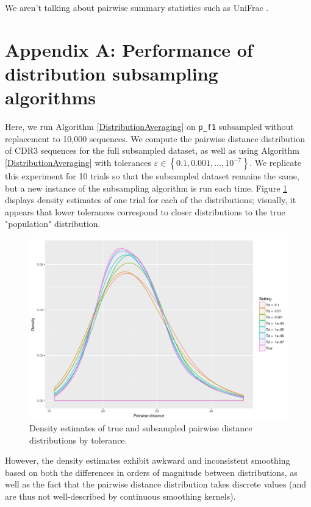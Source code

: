 \documentclass{article}
\begin{document}
We aren't talking about pairwise summary statistics such as UniFrac \cite{De_Bourcy2017-pu}.




\section*{Appendix A: Performance of distribution subsampling algorithms}
Here, we run Algorithm \ref{DistributionAveraging} on \texttt{p\_f1} subsampled without replacement to 10,000 sequences.
We compute the pairwise distance distribution of CDR3 sequences for the full subsampled dataset, as well as using Algorithm \ref{DistributionAveraging} with tolerances $\varepsilon \in \left\{0.1, 0.001, \dotsc, 10^{-7} \right\}$.
We replicate this experiment for 10 trials so that the subsampled dataset remains the same, but a new instance of the subsampling algorithm is run each time.
Figure \ref{fig:Distributions} displays density estimates of one trial for each of the distributions; visually, it appears that lower tolerances correspond to closer distributions to the true "population" distribution.
\begin{figure}
    \includegraphics[width=\linewidth]{Figures/PairwiseDistance/density_by_tol.pdf}
    \caption{Density estimates of true and subsampled pairwise distance distributions by tolerance.}
    \label{fig:Distributions}
\end{figure}
However, the density estimates exhibit awkward and inconsistent smoothing based on both the differences in orders of magnitude between distributions, as well as the fact that the pairwise distance distribution takes discrete values (and are thus not well-described by continuous smoothing kernels).
\end{document}
